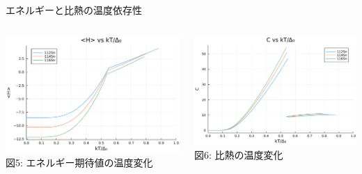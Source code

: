 \documentclass[aspectratio=169, 12pt, dvipdfmx]{beamer}
\begin{document}
\begin{frame}{エネルギーと比熱の温度依存性}
  \begin{columns}[totalwidth=1.0\linewidth]
    \begin{column}[T]{0.48\linewidth}
      \centering
      \includegraphics[width=\textwidth]{fig_pdf/Comp_FT_H.pdf}
      \vspace{5pt}
      \scriptsize 図5: エネルギー期待値の温度変化
    \end{column}

    \begin{column}[T]{0.48\linewidth}
      \centering
      \includegraphics[width=\textwidth]{fig_pdf/Comp_FT_C.pdf}
      \vspace{5pt}
      \scriptsize 図6: 比熱の温度変化
    \end{column}
  \end{columns}
\end{frame}
\end{document}
